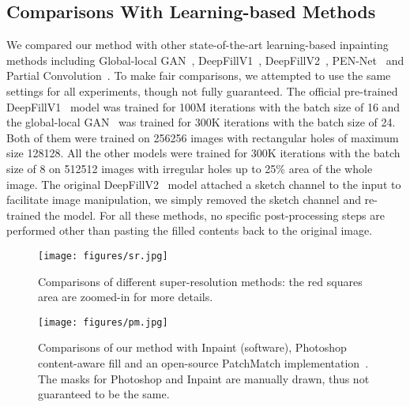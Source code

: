 \documentclass[oribibl]{llncs}  \usepackage[width=122mm,left=12mm,paperwidth=146mm,height=193mm,top=12mm,paperheight=217mm]{geometry}
\begin{document}
\subsection{Comparisons With Learning-based Methods}
We compared our method with other state-of-the-art learning-based inpainting methods including Global-local GAN~\cite{iizuka2017globally}, DeepFillV1~\cite{yu2018generative}, DeepFillV2~\cite{yu2018free}, PEN-Net~\cite{zeng2019learning} and Partial Convolution~\cite{liu2018image}. To make fair comparisons, we attempted to use the same settings for all experiments, though not fully guaranteed. The official pre-trained DeepFillV1~\cite{yu2018generative} model was trained for 100M iterations with the batch size of 16 and the global-local GAN~\cite{iizuka2017globally} was trained for 300K iterations with the batch size of 24. Both of them were trained on 256256 images with rectangular holes of maximum size 128128. All the other models were trained for 300K iterations with the batch size of 8 on 512512 images with irregular holes up to 25\% area of the whole image. The original DeepFillV2~\cite{yu2018free} model attached a sketch channel to the input to facilitate image manipulation, we simply removed the sketch channel and re-trained the model. For all these methods, no specific post-processing steps are performed other than pasting the filled contents back to the original image.

\begin{figure*}[h]
	\begin{center}
		\texttt{[image: figures/sr.jpg]} 
	\end{center}
	\caption{Comparisons of different super-resolution methods: the red squares area are zoomed-in for more details.}
	\label{fig:hd}
\end{figure*}



\begin{figure*}[h]
\begin{center}
  \texttt{[image: figures/pm.jpg]} 
\end{center}
   \caption{Comparisons of our method with Inpaint (software), Photoshop content-aware fill and an open-source PatchMatch implementation~\cite{Hsieh_patchmatch2019}. The masks for Photoshop and Inpaint are manually drawn, thus not guaranteed to be the same. }
\label{fig:hd4}
\end{figure*}
\end{document}
